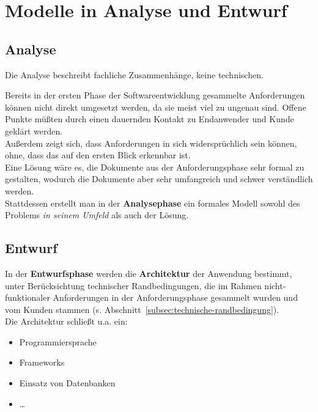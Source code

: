 \section{Modelle in Analyse und Entwurf}

\subsection*{Analyse}

\vspace{2mm}
Die Analyse beschreibt fachliche Zusammenhänge, keine technischen.
\vspace{2mm}



Bereits in der ersten Phase der Softwareentwicklung gesammelte Anforderungen können nicht direkt umgesetzt werden, da sie meist viel zu ungenau sind.
Offene Punkte müßten durch einen dauernden Kontakt zu Endanwender und Kunde geklärt werden.\\
Außerdem zeigt sich, dass Anforderungen in sich widersprüchlich sein können, ohne, dass das auf den ersten Blick erkennbar ist.\\

\noindent
Eine Lösung wäre es, die Dokumente aus der Anforderungsphase sehr formal zu gestalten, wodurch die Dokumente aber sehr umfangreich und schwer verständlich werden.\\

\noindent
Stattdessen erstellt man in der \textbf{Analysephase} ein formales Modell sowohl des Problems \textit{in seinem Umfeld} als auch der Lösung.

\subsection*{Entwurf}
In der \textbf{Entwurfsphase} werden die \textbf{Architektur} der Anwendung bestimmt, unter Berücksichtung technischer Randbedingungen, die im Rahmen nicht-funktionaler Anforderungen in der Anforderungsphase gesammelt wurden und vom Kunden stammen (s. Abschnitt~\ref{subsec:technische-randbedingung}).\\
Die Architektur schließt u.a. ein:

\begin{itemize}
    \item Programmiersprache
    \item Frameworks
    \item Einsatz von Datenbanken
    \item \ldots
\end{itemize}

